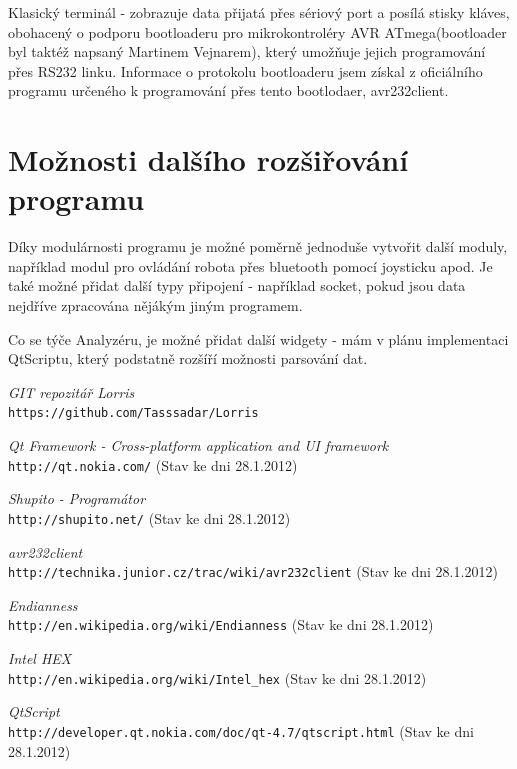 \documentclass[12pt, a4paper, oneside]{article}
\newcommand{\It}{\textit}  %
\begin{document}
Klasický terminál - zobrazuje data přijatá přes sériový port a posílá stisky kláves, obohacený o podporu bootloaderu pro mikrokontroléry AVR ATmega(bootloader byl taktéž napsaný Martinem Vejnarem), který umožňuje jejich programování přes RS232 linku. Informace o protokolu bootloaderu jsem získal z oficiálního programu určeného k programování přes tento bootlodaer, avr232client\cite{avr232client}.

\newpage
\setlength{\voffset}{0mm} %
\pagestyle{plain}

\section*{Možnosti dalšího rozšiřování programu}
Díky modulárnosti programu je možné poměrně jednoduše vytvořit další moduly, například modul pro ovládání robota přes bluetooth pomocí joysticku apod. Je také možné přidat další typy připojení - například socket, pokud jsou data nejdříve zpracována nějákým jiným programem.

Co se týče Analyzéru, je možné přidat další widgety - mám v plánu implementaci QtScriptu\cite{qtscript}, který podstatně rozšíří možnosti parsování dat.

\newpage
{}
 \begin{thebibliography}{99}
     \It{GIT repozitář Lorris} \\
    \verb#https://github.com/Tasssadar/Lorris#

     \It{Qt Framework - Cross-platform application and UI framework} \\
    \verb#http://qt.nokia.com/# (Stav ke dni 28.1.2012)
    
     \It{Shupito - Programátor} \\
    \verb#http://shupito.net/# (Stav ke dni 28.1.2012)

     \It{avr232client} \\
    \verb#http://technika.junior.cz/trac/wiki/avr232client# (Stav ke dni 28.1.2012)

     \It{Endianness} \\
    \verb#http://en.wikipedia.org/wiki/Endianness# (Stav ke dni 28.1.2012)

     \It{Intel HEX} \\
    \verb#http://en.wikipedia.org/wiki/Intel_hex# (Stav ke dni 28.1.2012)
    
     \It{QtScript} \\
    \verb#http://developer.qt.nokia.com/doc/qt-4.7/qtscript.html# (Stav ke dni 28.1.2012)    
\end{thebibliography}
\end{document}
